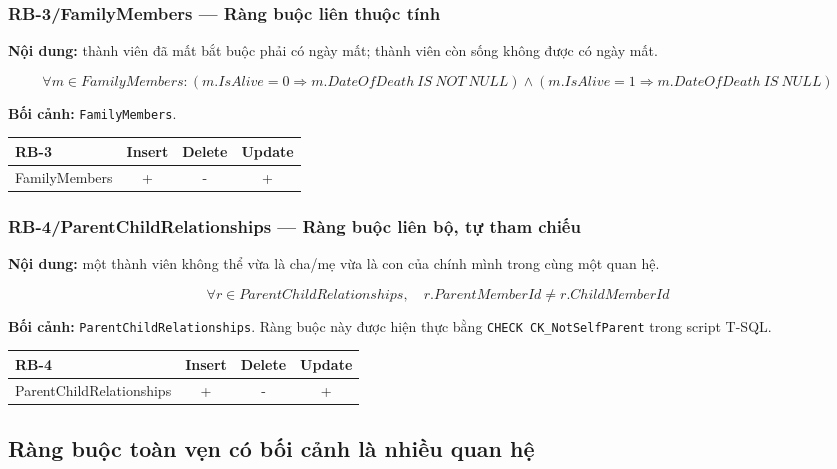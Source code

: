 \subsubsection*{RB-3/FamilyMembers --- Ràng buộc liên thuộc tính}

\textbf{Nội dung:} thành viên đã mất bắt buộc phải có ngày mất; thành viên còn sống không được có ngày mất.

\[
\forall m\in FamilyMembers:
\left(m.IsAlive=0\Rightarrow m.DateOfDeath\ IS\ NOT\ NULL\right)
\land
\left(m.IsAlive=1\Rightarrow m.DateOfDeath\ IS\ NULL\right)
\]

\textbf{Bối cảnh:} \texttt{FamilyMembers}.

\begin{center}
\begin{tabular}{@{}lccc@{}}
\toprule
\textbf{RB-3} & \textbf{Insert} & \textbf{Delete} & \textbf{Update}\\
\midrule
FamilyMembers & + & - & +\\
\bottomrule
\end{tabular}
\end{center}

\subsubsection*{RB-4/ParentChildRelationships --- Ràng buộc liên bộ, tự tham chiếu}

\textbf{Nội dung:} một thành viên không thể vừa là cha/mẹ vừa là con của chính mình trong cùng một quan hệ.

\[
\forall r\in ParentChildRelationships,\quad
r.ParentMemberId\ne r.ChildMemberId
\]

\textbf{Bối cảnh:} \texttt{ParentChildRelationships}. Ràng buộc này được hiện thực bằng \texttt{CHECK CK\_NotSelfParent} trong script T-SQL.

\begin{center}
\begin{tabular}{@{}lccc@{}}
\toprule
\textbf{RB-4} & \textbf{Insert} & \textbf{Delete} & \textbf{Update}\\
\midrule
ParentChildRelationships & + & - & +\\
\bottomrule
\end{tabular}
\end{center}

\subsection{Ràng buộc toàn vẹn có bối cảnh là nhiều quan hệ}

